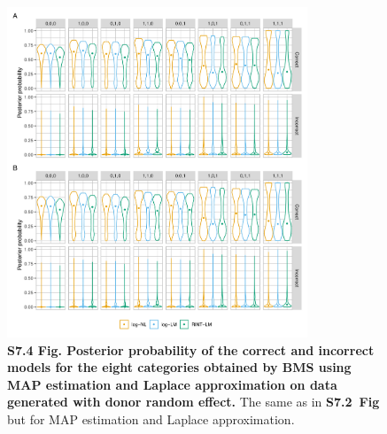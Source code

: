 \documentclass[11pt]{article}
\newcommand{\sfigppmcmctwo}{\textbf{S7.2~Fig}\xspace}
\begin{document}
\begin{figure}[!ht]
\begin{center}
  \includegraphics[width=0.8\textwidth]{png/sim_vln_map_lap2.png}
\end{center}  
\caption{
  {\bf
    S7.4 Fig.
    Posterior probability of the correct and incorrect models for the eight categories obtained by BMS using MAP estimation and Laplace approximation on data generated with donor random effect.}
The same as in \sfigppmcmctwo but for MAP estimation and Laplace approximation.
}
\label{s-fig:sim-vln-map2}
\end{figure}
\end{document}
